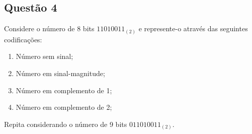 \documentclass{article}
\begin{document}
        \subsection{Questão 4}
            \begin{exercise}
                Considere o número de 8 bits $11010011_{(2)}$ e represente-o através das seguintes codificações:
                    \begin{enumerate}[noitemsep]
                        \item Número sem sinal;
                        \item Número em sinal-magnitude;
                        \item Número em complemento de 1;
                        \item Número em complemento de 2;
                    \end{enumerate}
                Repita considerando o número de 9 bits $011010011_{(2)}$.
            \end{exercise}
\end{document}

